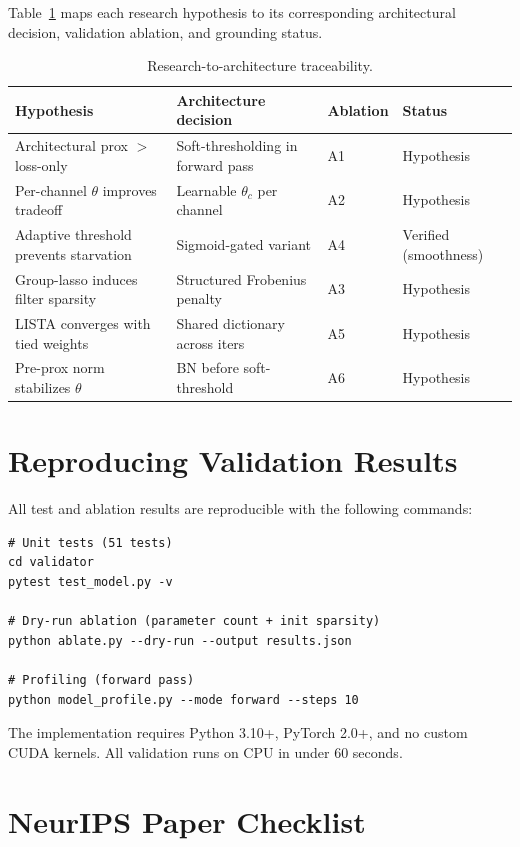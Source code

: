 \documentclass{article}
\begin{document}
Table~\ref{tab:trace} maps each research hypothesis to its corresponding
architectural decision, validation ablation, and grounding status.

\begin{table}[h]
\centering
\caption{Research-to-architecture traceability.}\label{tab:trace}
\small
\begin{tabular}{p{3cm}p{3.5cm}p{2.5cm}p{2cm}}
\toprule
Hypothesis & Architecture decision & Ablation & Status \\
\midrule
Architectural prox $>$ loss-only & Soft-thresholding in forward pass & A1 & Hypothesis \\
Per-channel $\theta$ improves tradeoff & Learnable $\theta_c$ per channel & A2 & Hypothesis \\
Adaptive threshold prevents starvation & Sigmoid-gated variant & A4 & Verified (smoothness) \\
Group-lasso induces filter sparsity & Structured Frobenius penalty & A3 & Hypothesis \\
LISTA converges with tied weights & Shared dictionary across iters & A5 & Hypothesis \\
Pre-prox norm stabilizes $\theta$ & BN before soft-threshold & A6 & Hypothesis \\
\bottomrule
\end{tabular}
\end{table}

\section{Reproducing Validation Results}

All test and ablation results are reproducible with the following commands:

\begin{verbatim}
# Unit tests (51 tests)
cd validator
pytest test_model.py -v

# Dry-run ablation (parameter count + init sparsity)
python ablate.py --dry-run --output results.json

# Profiling (forward pass)
python model_profile.py --mode forward --steps 10
\end{verbatim}

The implementation requires Python 3.10+, PyTorch 2.0+, and no custom CUDA
kernels. All validation runs on CPU in under 60 seconds.

\newpage
\section*{NeurIPS Paper Checklist}
\end{document}

